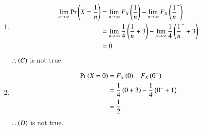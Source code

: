 \documentclass[journal,12pt,twocolumn]{IEEEtran}
\theoremstyle{remark}
\begin{document}
\begin{enumerate}[label=(\Alph*)]
    \item \begin{align}
    		\lim_{n \to \infty} \Pr\left(X = \frac{1}{n}\right) &= \lim_{n \to \infty}F_X\left(\frac{1}{n}\right) - \lim_{n \to \infty}F_X\left(\frac{1}{n}^-\right)\\
    		&= \lim_{n \to \infty}\frac{1}{4}\left(\frac{1}{n}+3\right) - \lim_{n \to \infty}\frac{1}{4}\left(\frac{1}{n}^-+3\right)\\
    		&= 0
    	\end{align}
    	$\therefore \left(C\right)$ is not true.
    	
    	\item \begin{align}
    		\Pr\left(X = 0\right) &= F_X\left(0\right) - F_X\left(0^-\right)\\
    		&= \frac{1}{4}\left(0+3\right) - \frac{1}{4}\left(0^-+1\right)\\
    		&= \frac{1}{2}
    	\end{align}
    	$\therefore \left(D\right)$ is not true.
\end{enumerate}
\end{document}
